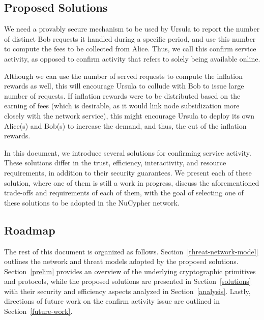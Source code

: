 \subsection{Proposed Solutions}
We need a provably secure mechanism to be used by Ursula to report the 
number of distinct Bob requests it handled during a specific period, and use this number 
to compute the fees to be collected from Alice. Thus, we call this confirm 
service activity, as opposed to confirm activity that refers to solely being available 
online.


Although we can use the number of served requests to compute the inflation 
rewards as well, this will encourage Ursula to collude with Bob to issue large 
number of requests. If inflation rewards were to be distributed based on the earning of fees (which is desirable, as it would link node subsidization more closely with the network service), this might encourage Ursula to deploy its own Alice(s) 
and Bob(s) to increase the demand, and thus, the cut of the inflation rewards.


In this document, we introduce several solutions for confirming service activity. 
These solutions differ in the trust, efficiency, interactivity, and resource 
requirements, in addition to their security guarantees. We present each of these 
solution, where one of them is still a work in progress, discuss the aforementioned 
trade-offs and requirements of each of them, with the goal of selecting one of these 
solutions to be adopted in the NuCypher network.


\subsection{Roadmap}
The rest of this document is organized as follows. Section~\ref{threat-network-model} 
outlines the network and threat models adopted by the proposed solutions. 
Section~\ref{prelim} provides an overview of the underlying cryptographic primitives and 
protocols, while the proposed solutions are presented 
in Section~\ref{solutions} with their security and efficiency aspects analyzed in 
Section~\ref{analysis}. Lastly, directions of future work on the confirm activity issue 
are outlined in Section~\ref{future-work}.


